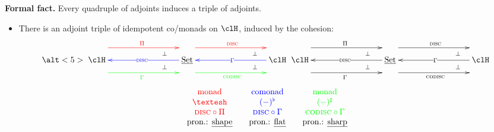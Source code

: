 \documentclass[presentation]{beamer}
\begin{document}
%
%
%
%
%
%
%
%
%
\begin{frame}
	\onslide<+->
	\begin{block}{}
		\textbf{Formal fact.} Every quadruple of adjoints induces a triple of adjoints.
	\end{block}
	\onslide<+->
		\begin{itemize}
			\item<+-> There is an adjoint triple of idempotent co/monads on $\clH$, induced by the cohesion:
			      \[
				      \alt<5>{
				      \xymatrix@C=3cm{
				      \clH
				      \ar@{}@<8pt>[r]|(.75)\perp
				      \ar@{}@<-8pt>[r]|(.75)\perp
				      \ar@[red]@<15pt>[r]^{\color{red}\Pi}
				      \ar@[blue]@{<-}[r]|{\color{blue}\disc}
				      \ar@[green]@<-15pt>[r]_{\color{green}\Gamma}
				      &
				      \Set
				      \ar@{}@<8pt>[r]|(.75)\perp
				      \ar@{}@<-8pt>[r]|(.75)\perp
				      \ar@[red]@<15pt>[r]^{\color{red}\disc}
				      \ar@[blue]@{<-}[r]|{\color{blue}\Gamma}
				      \ar@[green]@<-15pt>[r]_{\color{green}\codisc}
				      &
				      \clH}
				      }{\xymatrix@C=3cm{
				      \clH
				      \ar@{}@<8pt>[r]|(.75)\perp
				      \ar@{}@<-8pt>[r]|(.75)\perp
				      \ar@<15pt>[r]^\Pi
				      \ar@{<-}[r]|\disc
				      \ar@<-15pt>[r]_\Gamma &
				      \Set
				      \ar@{}@<8pt>[r]|(.75)\perp
				      \ar@{}@<-8pt>[r]|(.75)\perp
				      \ar@<15pt>[r]^\disc
				      \ar@{<-}[r]|\Gamma
				      \ar@<-15pt>[r]_\codisc & \clH
				      }}
			      \]
			      \onslide<+->
			      \[
				      \begin{array}{ccccc}
					      {\color{red}\text{monad}}    &  &
					      {\color{blue}\text{comonad}} &  &
					      {\color{green}\text{monad}}                                           \\
					      {\color{red}\shape}          &  &
					      {\color{blue}(-)^\flat}          &  &
					      {\color{green}(-)^\sharp}                                                 \\
					      {\color{red}\disc\circ\Pi}
					                                   &  & {\color{blue}\disc\circ\Gamma} &  &
					      {\color{green}\codisc\circ\Gamma}                                     \\
					      \text{pron.: \emph{shape}}                 &  &
					      \text{pron.: \emph{flat}}                  &  &
					      \text{pron.: \emph{sharp}}
				      \end{array}
			      \]
		\end{itemize}
\end{frame}
\end{document}

